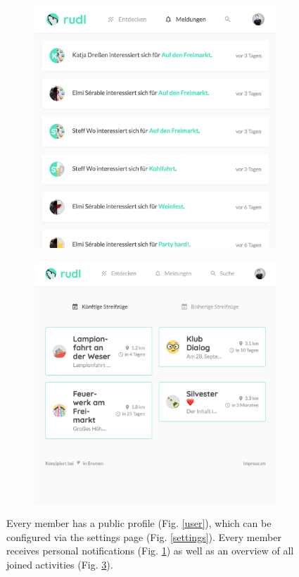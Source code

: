 \documentclass[12pt,numbers=noenddot,parskip,bibliography=totocnumbered,listof=totocnumbered,draft]{scrreprt}
\begin{document}
\begin{figure}
\bigskip

\begin{subfigure}[t]{0.45\textwidth}%
\centering
\includegraphics[width=\linewidth]{notifications.png}
\caption{}
\label{notifications}
\end{subfigure}%
\hfill
\begin{subfigure}[t]{0.45\textwidth}%
\centering
\includegraphics[width=\linewidth]{useractivities.png}
\caption{}
\label{useractivities}
\end{subfigure}%
\caption[Profile management and notifications]{Every member has a public profile (Fig. \ref{user}), which can be configured via the settings page (Fig. \ref{settings}). Every member receives personal notifications (Fig. \ref{notifications}) as well as an overview of all joined activities (Fig. \ref{useractivities}).}
\end{figure}
\end{document}
